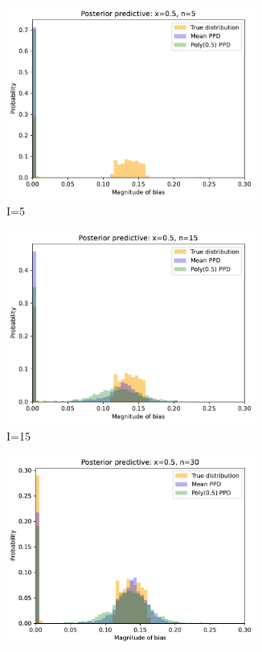 \begin{figure}[H]
\centering
\begin{subfigure}{.45\textwidth}
	\centering
	\includegraphics[width=0.9\textwidth]{figures/one-ppd-lrr-bias-5.pdf}
	\caption{I=5}
\end{subfigure}%
\begin{subfigure}{.45\textwidth}
	\centering
	\includegraphics[width=0.9\textwidth]{figures/one-ppd-lrr-bias-15.pdf}
	\caption{I=15}
\end{subfigure}
\begin{subfigure}{.45\textwidth}
	\centering
	\includegraphics[width=0.9\textwidth]{figures/one-ppd-lrr-bias-30.pdf}

\end{subfigure}
\end{figure}
